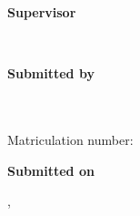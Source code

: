 {\begin{textblock*}{1\textwidth}
	
	\ifthenelse{\equal{\themenstellerlehrstuhl}{\betreutvonlehrstuhl}}
	{%
		\ifthenelse{\equal{\themensteller}{\betreutvonperson}}{}
		{%
	\vspace*{2mm}
	\textbf{Supervisor}\tab\hspace{-3cm}
	\begin{minipage}[t]{\textwidth-\CurrentLineWidth}
		\betreutvonlehrstuhl\\
		\betreutvonperson
	\end{minipage}
	}}{}
	
	\vspace*{2mm}
	\textbf{Submitted by}\tab\hspace{-3cm}
	\begin{minipage}[t]{\textwidth-\CurrentLineWidth}
		\derauthor\\
		\adresse\\
		Matriculation number: \matrikelnr\\
		\emailadresse\strut
	\end{minipage}
	
	\vspace*{2mm}
	\textbf{Submitted on}\tab\hspace{-3cm}
	\begin{minipage}[t]{\textwidth-\CurrentLineWidth}
		\eingereichtamort, \eingereichtamdatum\strut
	\end{minipage}
\end{textblock*}

}

\cleardoubleemptypage